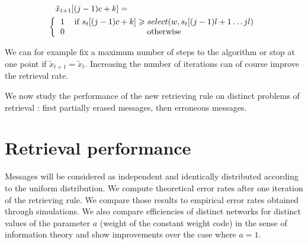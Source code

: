 \documentclass[english,10pt,twocolumn]{IEEEtran}
\renewcommand{\ge}{\geqslant}
\newcommand*\Let[2]{\State #1 $\gets$ #2}
\theoremstyle{definition}
\begin{document}
		\begin{align*}
		&\tilde{x}_{t+1}[(j-1)c+k] =\\ \bigg \{
  			&\begin{tabular}{ccc}
  			$1$ & if $s_t[(j-1)c+k] \ge  \mbox{select}(w, s_t[(j-1)l+1 \hdots jl)$ \\
  			$0$ & otherwise 
  		\end{tabular}
  		\end{align*}
		
		We can for example fix a maximum number of steps to the algorithm or stop at one point if $\tilde{x}_{t+1} = \tilde{x}_t$. Increasing the number of iterations can of course improve the retrieval rate.
		
		
		
	
	
	We now study the performance of the new retrieving rule on distinct problems of retrieval : first partially erased messages, then erroneous messages.%
	
	\section{Retrieval performance}	
	
	Messages will be considered as independent and identically distributed according to the uniform distribution. We compute theoretical error rates after one iteration of the retrieving rule. We compare those results to empirical error rates obtained through simulations. We also compare efficiencies of distinct networks for distinct values of the parameter $a$ (weight of the constant weight code) in the sense of information theory and show improvements over the case where $a = 1$.
\end{document}
